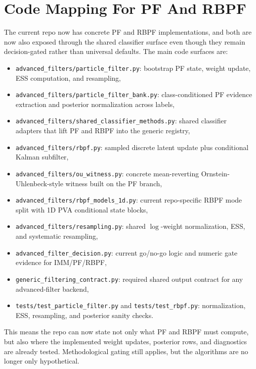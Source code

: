 \documentclass[11pt]{article}
\begin{document}
\section{Code Mapping For PF And RBPF}

The current repo now has concrete PF and RBPF implementations, and both are now
also exposed through the shared classifier surface even though they remain
decision-gated rather than universal defaults. The main code surfaces are:
\begin{itemize}[leftmargin=1.5em]
    \item \texttt{advanced\_filters/particle\_filter.py}: bootstrap PF state,
    weight update, ESS computation, and resampling,
    \item \texttt{advanced\_filters/particle\_filter\_bank.py}: class-conditioned
    PF evidence extraction and posterior normalization across labels,
    \item \texttt{advanced\_filters/shared\_classifier\_methods.py}: shared
    classifier adapters that lift PF and RBPF into the generic registry,
    \item \texttt{advanced\_filters/rbpf.py}: sampled discrete latent update plus
    conditional Kalman subfilter,
    \item \texttt{advanced\_filters/ou\_witness.py}: concrete mean-reverting
    Ornstein-Uhlenbeck-style witness built on the PF branch,
    \item \texttt{advanced\_filters/rbpf\_models\_1d.py}: current repo-specific
    RBPF mode split with 1D PVA conditional state blocks,
    \item \texttt{advanced\_filters/resampling.py}: shared
    \(\log\)-weight normalization, ESS, and systematic resampling,
    \item \texttt{advanced\_filter\_decision.py}: current go/no-go logic and
    numeric gate evidence for IMM/PF/RBPF,
    \item \texttt{generic\_filtering\_contract.py}: required shared output
    contract for any advanced-filter backend,
    \item \texttt{tests/test\_particle\_filter.py} and
    \texttt{tests/test\_rbpf.py}: normalization, ESS, resampling, and posterior
    sanity checks.
\end{itemize}
This means the repo can now state not only what PF and RBPF must compute, but
also where the implemented weight updates, posterior rows, and diagnostics are
already tested. Methodological gating still applies, but the algorithms are no
longer only hypothetical.
\end{document}
